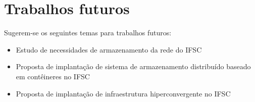 \section{Trabalhos futuros}

Sugerem-se os seguintes temas para trabalhos futuros:

\begin{itemize}
    \item Estudo de necessidades de armazenamento da rede do IFSC
    \item Proposta de implantação de sistema de armazenamento distribuído baseado em contêineres no IFSC
    \item Proposta de implantação de infraestrutura hiperconvergente no IFSC
\end{itemize}